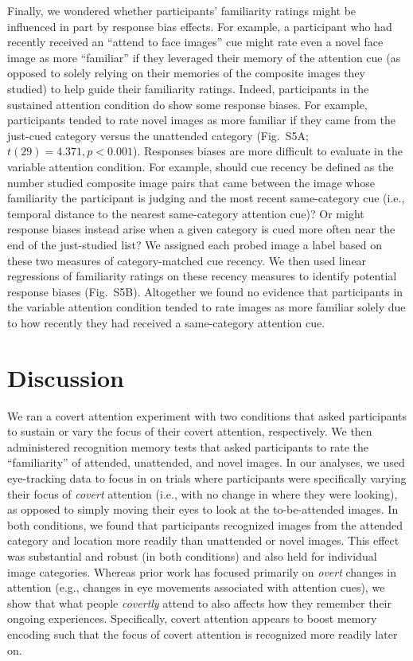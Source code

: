 \documentclass[english]{article}
\newcommand{\responseBias}{S5}
\begin{document}
Finally, we wondered whether participants' familiarity ratings might be
influenced in part by response bias effects. For example, a participant who had
recently received an ``attend to face images'' cue might rate even a novel face
image as more ``familiar'' if they leveraged their memory of the attention cue
(as opposed to solely relying on their memories of the composite images they
studied) to help guide their familiarity ratings. Indeed, participants in the
sustained attention condition do show some response biases. For example,
participants tended to rate novel images as more familiar if they came from the
just-cued category versus the unattended category (Fig.~\responseBias A; $t(29)
= 4.371, p < 0.001$). Responses biases are more difficult to evaluate in the
variable attention condition. For example, should cue recency be defined as the
number studied composite image pairs that came between the image whose
familiarity the participant is judging and the most recent same-category cue
(i.e., temporal distance to the nearest same-category attention cue)? Or might
response biases instead arise when a given category is cued more often near the
end of the just-studied list? We assigned each probed image a label based on
these two measures of category-matched cue recency. We then used linear
regressions of familiarity ratings on these recency measures to identify
potential response biases (Fig.~\responseBias B). Altogether we found no
evidence that participants in the variable attention condition tended to rate
images as more familiar solely due to how recently they had received a
same-category attention cue.

\section*{Discussion}

We ran a covert attention experiment with two conditions that asked
participants to sustain or vary the focus of their covert attention,
respectively. We then administered recognition memory tests that asked
participants to rate the ``familiarity'' of attended, unattended, and novel
images. In our analyses, we used eye-tracking data to focus in on trials where
participants were specifically varying their focus of \textit{covert} attention
(i.e., with no change in where they were looking), as opposed to simply moving
their eyes to look at the to-be-attended images. In both conditions, we found
that participants recognized images from the attended category and location
more readily than unattended or novel images. This effect was substantial and
robust (in both conditions) and also held for individual image categories.
Whereas prior work has focused primarily on \textit{overt} changes in attention
(e.g., changes in eye movements associated with attention cues), we show that
what people \textit{covertly} attend to also affects how they remember their
ongoing experiences. Specifically, covert attention appears to boost memory
encoding such that the focus of covert attention is recognized more readily
later on.
\end{document}
